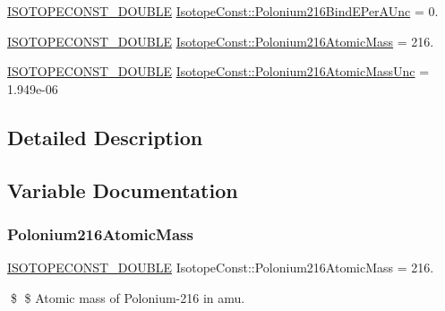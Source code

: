 \begin{DoxyCompactItemize}
\mbox{\hyperlink{group___isotope_const-_macros_ga8f45a7272ce02c0b4c65c44636ed719a}{I\+S\+O\+T\+O\+P\+E\+C\+O\+N\+S\+T\+\_\+\+D\+O\+U\+B\+LE}} \mbox{\hyperlink{group___isotope_const-_polonium-_po216_ga3647e2593ddc17182c584c8f20e7422d}{Isotope\+Const\+::\+Polonium216\+Bind\+E\+Per\+A\+Unc}} = 0.
\item 
\mbox{\hyperlink{group___isotope_const-_macros_ga8f45a7272ce02c0b4c65c44636ed719a}{I\+S\+O\+T\+O\+P\+E\+C\+O\+N\+S\+T\+\_\+\+D\+O\+U\+B\+LE}} \mbox{\hyperlink{group___isotope_const-_polonium-_po216_ga871e5054e0c1b811995452bddf945390}{Isotope\+Const\+::\+Polonium216\+Atomic\+Mass}} = 216.
\item 
\mbox{\hyperlink{group___isotope_const-_macros_ga8f45a7272ce02c0b4c65c44636ed719a}{I\+S\+O\+T\+O\+P\+E\+C\+O\+N\+S\+T\+\_\+\+D\+O\+U\+B\+LE}} \mbox{\hyperlink{group___isotope_const-_polonium-_po216_ga98bc8620bfa09c25003103c3dd417d57}{Isotope\+Const\+::\+Polonium216\+Atomic\+Mass\+Unc}} = 1.\+949e-\/06
\end{DoxyCompactItemize}


\subsection{Detailed Description}


\subsection{Variable Documentation}
\mbox{\label{group___isotope_const-_polonium-_po216_ga871e5054e0c1b811995452bddf945390}} 
\subsubsection{\texorpdfstring{Polonium216\+Atomic\+Mass}{Polonium216AtomicMass}}
{\footnotesize\ttfamily \mbox{\hyperlink{group___isotope_const-_macros_ga8f45a7272ce02c0b4c65c44636ed719a}{I\+S\+O\+T\+O\+P\+E\+C\+O\+N\+S\+T\+\_\+\+D\+O\+U\+B\+LE}} Isotope\+Const\+::\+Polonium216\+Atomic\+Mass = 216.}

\$ \$ Atomic mass of Polonium-\/216 in amu. \mbox{\label{group___isotope_const-_polonium-_po216_ga98bc8620bfa09c25003103c3dd417d57}} 
